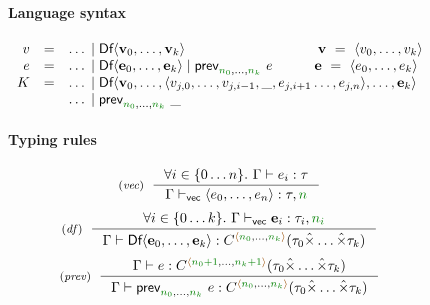 
\begin{figure}[t]
\vspace{-0.5em}
\paragraph{Language syntax}
\begin{equation*}
\begin{array}{rcl}
v &=& \ldots \sep \ident{Df}\langle \textbf{v}_0, \ldots, \textbf{v}_k \rangle
    \hspace{9.5em} \textbf{v} ~=~ \langle v_0, \ldots, v_k \rangle \\
e &=& \ldots \sep \ident{Df}\langle \textbf{e}_0, \ldots, \textbf{e}_k \rangle \sep \ident{prev}_{\cclrd{n_0}, \ldots, \cclrd{n_k}}~e
    \quad\qquad \textbf{e} ~=~ \langle e_0, \ldots, e_k \rangle \\
K &=& \ldots \sep \ident{Df}\langle \textbf{v}_0, \ldots, \langle v_{j,0}, \ldots, v_{j, i-1}, \_, e_{j, i+1} \ldots, e_{j, n}\rangle, \ldots, \textbf{e}_k\rangle \\
   && \ldots \sep \ident{prev}_{\cclrd{n_0}, \ldots, \cclrd{n_k}}~\_
\end{array}
\end{equation*}

\vspace{0.75em}
\paragraph{Typing rules}

\begin{equation*}
\tyrule{vec}
  { \forall i\in\{0\ldots n\}. ~ \Gamma \vdash e_i : \tau}
  { \Gamma \vdash_{\ident{vec}} \langle e_0, \ldots, e_n \rangle : \tau, \cclrd{n} }
\end{equation*}
\begin{equation*}
\tyrule{df}
  { \forall i\in\{0\ldots k\}. ~ \Gamma \vdash_{\ident{vec}} \textbf{e}_i : \tau_i, \cclrd{n_i}}
  { \Gamma \vdash \ident{Df}\langle \textbf{e}_0, \ldots, \textbf{e}_k \rangle : \ctyp{\alift{\cclrd{n_0}, \ldots, \cclrd{n_k}}}{(\tau_0\xtimes\ldots\xtimes\tau_k)} }
\end{equation*}
\begin{equation*}
\tyrule{prev}
  { \Gamma \vdash e : \ctyp{\alift{\cclrd{n_0+1},\ldots,\cclrd{n_k+1}}}{(\tau_0\xtimes\ldots\xtimes\tau_k)} }
  { \Gamma \vdash \ident{prev}_{\cclrd{n_0},\ldots,\cclrd{n_k}}~e : \ctyp{\alift{\cclrd{n_0},\ldots,\cclrd{n_k}}}{(\tau_0\xtimes\ldots\xtimes\tau_k)} }
\end{equation*}


\end{figure}
